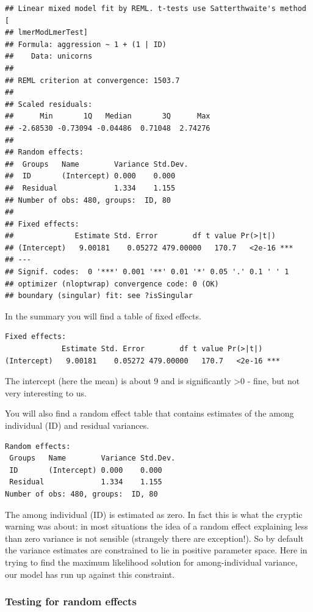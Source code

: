 \documentclass[
  12pt,
]{book}
\begin{document}
\begin{verbatim}
## Linear mixed model fit by REML. t-tests use Satterthwaite's method [
## lmerModLmerTest]
## Formula: aggression ~ 1 + (1 | ID)
##    Data: unicorns
## 
## REML criterion at convergence: 1503.7
## 
## Scaled residuals: 
##      Min       1Q   Median       3Q      Max 
## -2.68530 -0.73094 -0.04486  0.71048  2.74276 
## 
## Random effects:
##  Groups   Name        Variance Std.Dev.
##  ID       (Intercept) 0.000    0.000   
##  Residual             1.334    1.155   
## Number of obs: 480, groups:  ID, 80
## 
## Fixed effects:
##              Estimate Std. Error        df t value Pr(>|t|)    
## (Intercept)   9.00181    0.05272 479.00000   170.7   <2e-16 ***
## ---
## Signif. codes:  0 '***' 0.001 '**' 0.01 '*' 0.05 '.' 0.1 ' ' 1
## optimizer (nloptwrap) convergence code: 0 (OK)
## boundary (singular) fit: see ?isSingular
\end{verbatim}

In the summary you will find a table of fixed effects.

\begin{verbatim}
Fixed effects:
             Estimate Std. Error        df t value Pr(>|t|)    
(Intercept)   9.00181    0.05272 479.00000   170.7   <2e-16 ***
\end{verbatim}

The intercept (here the mean) is about 9 and is significantly \textgreater0 - fine, but not very interesting to us.

You will also find a random effect table that contains estimates of the among individual (ID) and residual variances.

\begin{verbatim}
Random effects:
 Groups   Name        Variance Std.Dev.
 ID       (Intercept) 0.000    0.000   
 Residual             1.334    1.155   
Number of obs: 480, groups:  ID, 80
\end{verbatim}

The among individual (ID) is estimated as zero. In fact this is what the cryptic warning was about: in most situations the idea of a random effect explaining less than zero variance is not sensible (strangely there are exception!). So by default the variance estimates are constrained to lie in positive parameter space. Here in trying to find the maximum likelihood solution for among-individual variance, our model has run up against this constraint.

\hypertarget{testing-for-random-effects}{%
\subsubsection{Testing for random effects}\label{testing-for-random-effects}}
\end{document}
